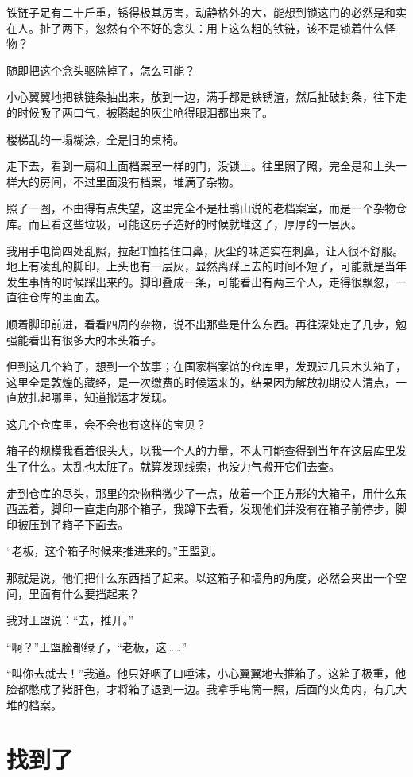 铁链子足有二十斤重，锈得极其厉害，动静格外的大，能想到锁这门的必然是和实在人。扯了两下，忽然有个不好的念头：用上这么粗的铁链，该不是锁着什么怪物？

随即把这个念头驱除掉了，怎么可能？

小心翼翼地把铁链条抽出来，放到一边，满手都是铁锈渣，然后扯破封条，往下走的时候吸了两口气，被腾起的灰尘呛得眼泪都出来了。

楼梯乱的一塌糊涂，全是旧的桌椅。

走下去，看到一扇和上面档案室一样的门，没锁上。往里照了照，完全是和上头一样大的房间，不过里面没有档案，堆满了杂物。

照了一圈，不由得有点失望，这里完全不是杜鹃山说的老档案室，而是一个杂物仓库。而且看这些垃圾，可能这房子造好的时候就堆这了，厚厚的一层灰。

我用手电筒四处乱照，拉起T恤捂住口鼻，灰尘的味道实在刺鼻，让人很不舒服。地上有凌乱的脚印，上头也有一层灰，显然离踩上去的时间不短了，可能就是当年发生事情的时候踩出来的。脚印叠成一条，可能看出有两三个人，走得很飘忽，一直往仓库的里面去。

顺着脚印前进，看看四周的杂物，说不出那些是什么东西。再往深处走了几步，勉强能看出有很多大的木头箱子。

但到这几个箱子，想到一个故事；在国家档案馆的仓库里，发现过几只木头箱子，这里全是敦煌的藏经，是一次缴费的时候运来的，结果因为解放初期没人清点，一直放扎起哪里，知道搬运才发现。

这几个仓库里，会不会也有这样的宝贝？

箱子的规模我看着很头大，以我一个人的力量，不太可能查得到当年在这层库里发生了什么。太乱也太脏了。就算发现线索，也没力气搬开它们去查。

走到仓库的尽头，那里的杂物稍微少了一点，放着一个正方形的大箱子，用什么东西盖着，脚印一直走向那个箱子，我蹲下去看，发现他们并没有在箱子前停步，脚印被压到了箱子下面去。

“老板，这个箱子时候来推进来的。”王盟到。

那就是说，他们把什么东西挡了起来。以这箱子和墙角的角度，必然会夹出一个空间，里面有什么要挡起来？

我对王盟说：“去，推开。”

“啊？”王盟脸都绿了，“老板，这……”

“叫你去就去！”我道。他只好咽了口唾沫，小心翼翼地去推箱子。这箱子极重，他脸都憋成了猪肝色，才将箱子退到一边。我拿手电筒一照，后面的夹角内，有几大堆的档案。

\chapter{找到了}

